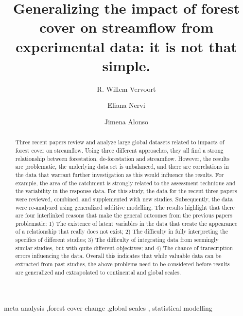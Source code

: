 \documentclass[]{elsarticle} %
\begin{document}
\begin{frontmatter}

  \title{Generalizing the impact of forest cover on streamflow from experimental data: it is not that simple.}
    \author[a,b]{R. Willem Vervoort}
    \author[c]{Eliana Nervi}
    \author[d]{Jimena Alonso}
  
  \begin{abstract}
  Three recent papers review and analyze large global datasets related to impacts of forest cover on streamflow. Using three different approaches, they all find a strong relationship between forestation, de-forestation and streamflow. However, the results are problematic, the underlying data set is unbalanced, and there are correlations in the data that warrant further investigation as this would influence the results. For example, the area of the catchment is strongly related to the assessment technique and the variability in the response data. For this study, the data for the recent three papers were reviewed, combined, and supplemented with new studies. Subsequently, the data were re-analyzed using generalized additive modelling.
  The results highlight that there are four interlinked reasons that make the general outcomes from the previous papers problematic: 1) The existence of latent variables in the data that create the appearance of a relationship that really does not exist; 2) The difficulty in fully interpreting the specifics of different studies; 3) The difficulty of integrating data from seemingly similar studies, but with quite different objectives; and 4) The chance of transcription errors influencing the data. Overall this indicates that while valuable data can be extracted from past studies, the above problems need to be considered before results are generalized and extrapolated to continental and global scales.
  \end{abstract}
    \begin{keyword}
    meta analysis \sep forest cover change \sep global scales \sep 
    statistical modelling
  \end{keyword}
  
 \end{frontmatter}
\end{document}
